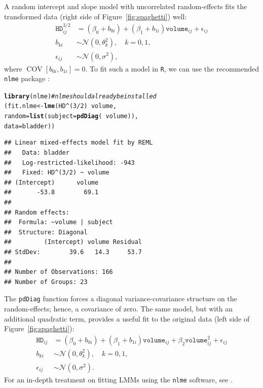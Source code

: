 \documentclass{article}\usepackage[]{graphicx}\usepackage[]{color}
\makeatletter
\newcommand{\hlnum}[1]{\textcolor[rgb]{0.686,0.059,0.569}{#1}}%
\newcommand{\hlcom}[1]{\textcolor[rgb]{0.678,0.584,0.686}{\textit{#1}}}%
\newcommand{\hlopt}[1]{\textcolor[rgb]{0,0,0}{#1}}%
\newcommand{\hlstd}[1]{\textcolor[rgb]{0.345,0.345,0.345}{#1}}%
\newcommand{\hlkwb}[1]{\textcolor[rgb]{0.69,0.353,0.396}{#1}}%
\newcommand{\hlkwc}[1]{\textcolor[rgb]{0.333,0.667,0.333}{#1}}%
\newcommand{\hlkwd}[1]{\textcolor[rgb]{0.737,0.353,0.396}{\textbf{#1}}}%
\newenvironment{kframe}{%
 \def\at@end@of@kframe{}%
 \ifinner\ifhmode%
  \def\at@end@of@kframe{\end{minipage}}%
  \begin{minipage}{\columnwidth}%
 \fi\fi%
 \def\FrameCommand##1{\hskip\@totalleftmargin \hskip-\fboxsep
 \colorbox{shadecolor}{##1}\hskip-\fboxsep
     \hskip-\linewidth \hskip-\@totalleftmargin \hskip\columnwidth}%
 \MakeFramed {\advance\hsize-\width
   \@totalleftmargin\z@ \linewidth\hsize
   \@setminipage}}%
 {\par\unskip\endMakeFramed%
 \at@end@of@kframe}
\newenvironment{knitrout}{}{} %
\newcommand{\COV}{\operatorname{COV}}
\makeatother
\begin{document}
A random intercept and slope model with uncorrelated random-effects fits the transformed data (right side of Figure~\ref{fig:spaghetti}) well:
\begin{align*}
  \texttt{HD}^{3/2}_{ij} &= \left(\beta_0 + b_{0i}\right) + \left(\beta_1 + b_{1i}\right)\texttt{volume}_{ij} + \epsilon_{ij} \\
  b_{ki} &\sim \mathcal{N}\left(0, \theta_k^2\right), \quad k = 0, 1, \\
  \epsilon_{ij} &\sim \mathcal{N}\left(0, \sigma^2\right),
\end{align*}
where $\COV\left[b_{0i}, b_{1i}\right] = 0$.  To fit such a model in \texttt{R}, we can use the recommended \texttt{nlme} package \citep{pinheiro-nlme-2013}:
\begin{knitrout}
\color{fgcolor}\begin{kframe}
\begin{alltt}
\hlkwd{library}\hlstd{(nlme)}  \hlcom{# nlme should already be installed}
\hlstd{(fit.nlme} \hlkwb{<-} \hlkwd{lme}\hlstd{(HD}\hlopt{^}\hlstd{(}\hlnum{3}\hlopt{/}\hlnum{2}\hlstd{)} \hlopt{~} \hlstd{volume,}
                 \hlkwc{random} \hlstd{=} \hlkwd{list}\hlstd{(}\hlkwc{subject} \hlstd{=} \hlkwd{pdDiag}\hlstd{(}\hlopt{~}\hlstd{volume)),}
                 \hlkwc{data} \hlstd{= bladder))}
\end{alltt}
\begin{verbatim}
## Linear mixed-effects model fit by REML
##   Data: bladder 
##   Log-restricted-likelihood: -943
##   Fixed: HD^(3/2) ~ volume 
## (Intercept)      volume 
##       -53.8        69.1 
## 
## Random effects:
##  Formula: ~volume | subject
##  Structure: Diagonal
##         (Intercept) volume Residual
## StdDev:        39.6   14.3     53.7
## 
## Number of Observations: 166
## Number of Groups: 23
\end{verbatim}
\end{kframe}
\end{knitrout}
The \texttt{pdDiag} function forces a diagonal variance-covariance structure on the random-effects; hence, a covariance of zero. The same model, but with an additional quadratic term, provides a useful fit to the original data (left side of Figure~\ref{fig:spaghetti}):
\begin{align*}
  \texttt{HD}_{ij} &= \left(\beta_0 + b_{0i}\right) + \left(\beta_1 + b_{1i}\right)\texttt{volume}_{ij} + \beta_2\texttt{volume}_{ij}^2 + \epsilon_{ij} \\
  b_{ki} &\sim \mathcal{N}\left(0, \theta_k^2\right), \quad k = 0, 1, \\
  \epsilon_{ij} &\sim \mathcal{N}\left(0, \sigma^2\right).
\end{align*}
For an in-depth treatment on fitting LMMs using the \texttt{nlme} software, see \citet{pinheiro-mixed-2000}.
\end{document}

